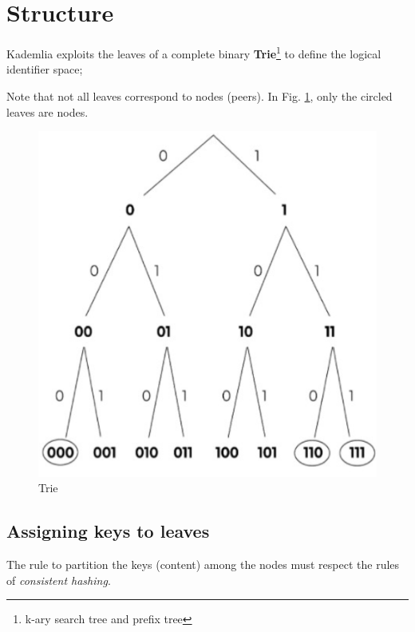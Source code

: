\section{Structure}
\begin{paracol}{2}
   \colfill
   Kademlia exploits the leaves of a complete binary \textbf{Trie}\footnote{k-ary search tree and prefix tree} to define the logical identifier space;

   Note that not all leaves correspond to nodes (peers). In Fig. \ref{fig:kademlia_trie}, only the circled leaves are nodes.
   \colfill
   \switchcolumn

   \begin{figure}[htbp]
      \centering
      \includegraphics{images/kademlia_trie.png}
      \caption{Trie}
      \label{fig:kademlia_trie}
   \end{figure}
\end{paracol}

\newpage
\subsection{Assigning keys to leaves}
The rule to partition the keys (content) among the nodes must respect the rules of \textit{consistent hashing}.

